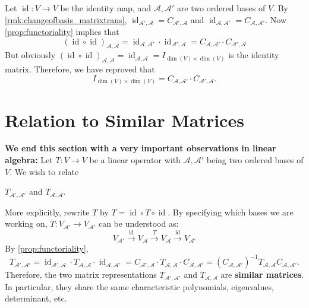 \begin{example}
Let $\operatorname{id}:V \to V$ be the identity map, and $\mathcal{A}, \mathcal{A}'$ are two ordered bases of $V$. By \autoref{rmk:changeofbasis_matrixtrans}, $\operatorname{id}_{\mathcal{A}',\mathcal{A}} = C_{\mathcal{A}',\mathcal{A}}$ and $\operatorname{id}_{\mathcal{A},\mathcal{A}'} = C_{\mathcal{A},\mathcal{A}'}$. Now \autoref{prop:functoriality} implies that
$$(\operatorname{id} \circ \operatorname{id})_{\mathcal{A},\mathcal{A}} = \operatorname{id}_{\mathcal{A},\mathcal{A}'} \cdot \operatorname{id}_{\mathcal{A}',\mathcal{A}} = C_{\mathcal{A},\mathcal{A}'} \cdot C_{\mathcal{A}',\mathcal{A}}$$
But obviously $(\operatorname{id} \circ \operatorname{id})_{\mathcal{A},\mathcal{A}} = \operatorname{id}_{\mathcal{A},\mathcal{A}} = I_{\dim(V) \times \dim(V)}$
is the identity matrix. Therefore, we have reproved that
$$I_{\dim(V) \times \dim(V)} = C_{\mathcal{A},\mathcal{A}'} \cdot C_{\mathcal{A}',\mathcal{A}}.$$
\end{example}




\section{Relation to Similar Matrices} \label{sec:similar_basis}
{\bf We end this section with a very important observations in linear algebra:} 
Let \( T : V \to V \) be a linear operator with \( \mathcal{A}, \mathcal{A}' \) being two ordered bases of \( V \).  We wish to relate
\begin{center}
    $T_{\mathcal{A}',\mathcal{A}'}$ and $T_{\mathcal{A},\mathcal{A}}$.
\end{center}
More explicitly, rewrite $T$ by $T = \operatorname{id} \circ T \circ \operatorname{id}$. By specifying which bases we are working on, $T: V_{\mathcal{A}'} \to V_{\mathcal{A}'}$ can be understood as:
$$V_{\mathcal{A}'} \xrightarrow{\operatorname{id}} V_{\mathcal{A}} \xrightarrow{T} V_{\mathcal{A}}\xrightarrow{\operatorname{id}} V_{\mathcal{A}'}$$
By \autoref{prop:functoriality},
\[
T_{\mathcal{A}', \mathcal{A}'} = \operatorname{id}_{\mathcal{A}', \mathcal{A}} \cdot 
T_{\mathcal{A}, \mathcal{A}} \cdot \operatorname{id}_{\mathcal{A}, \mathcal{A}'}
= C_{\mathcal{A}', \mathcal{A}} \cdot T_{\mathcal{A}, \mathcal{A}} \cdot C_{\mathcal{A}, \mathcal{A}'} = (C_{\mathcal{A}, \mathcal{A}'})^{-1} T_{\mathcal{A}, \mathcal{A}} C_{\mathcal{A}, \mathcal{A}'}.
\]
Therefore, the two matrix representations \( T_{\mathcal{A}', \mathcal{A}'} \) and \( T_{\mathcal{A}, \mathcal{A}} \) are {\bf similar matrices}. In particular, they share the same characteristic polynomials, eigenvalues, determinant, etc.

